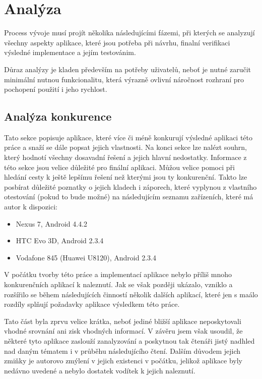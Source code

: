\documentclass[thesis=B,czech]{FITthesis}[2013/10/20]
\begin{document}
\chapter{Analýza}

Process vývoje musí projít několika následujícími fázemi, při kterých se analyzují všechny aspekty aplikace, které jsou potřeba při návrhu, finalní verifikaci výsledné implementace a jejím testovánim. 

Důraz analýzy je kladen především na potřeby uživatelů, neboť je nutné zaručit minimální nutnou funkcionalitu, která výrazně ovlivní náročnost rozhraní pro pochopení použití i jeho rychlost.

\section{Analýza konkurence}

Tato sekce popisuje aplikace, které více či méně konkurují výsledné aplikaci této práce a snaží se dále popsat jejich vlastnosti. Na konci sekce lze nalézt souhrn, který hodnotí všechny dosavadní řešení a jejich hlavní nedostatky. Informace z této sekce jsou velice důležité pro finální aplikaci. Můžou velice pomoci při hledání cesty k ještě lepšímu řešení než kterými jsou ty konkurenční. Takto lze posbírat důležité poznatky o jejich kladech i záporech, které vyplynou z vlastního otestování (pokud to bude možné) na následujícím seznamu zařízeních, které má autor k dispozici:
\begin{itemize}
  \item{Nexus 7, Android 4.4.2}
  \item{HTC Evo 3D, Android 2.3.4}
  \item{Vodafone 845 (Huawei U8120), Android 2.3.4}
\end{itemize}

V počátku tvorby této práce a implementací aplikace nebylo příliš mnoho konkurenčních aplikací k naleznutí. Jak se však později ukázalo, vzniklo a rozšířilo se během následujících činností několik dalších aplikací, které jen s maálo rozdíly splňují požadavky aplikace výsledkem této práce.

Tato část byla zprvu velice krátka, neboť jediné bližší aplikace neposkytovali vhodné srovnání ani zisk vhodných informací. V závěru jsem však usoudil, že některé tyto aplikace zaslouží zanalyzování a poskytnou tak čtenáři jistý nadhled nad daným tématem i v průběhu následujícího čtení. Dalším důvodem jejich zmiňky je autorovo zmýlení v jejich existenci v počátku, jelikož aplikace byly nedávno uvedené a nebylo dostatek vodítek k jejich naleznutí.
\end{document}
